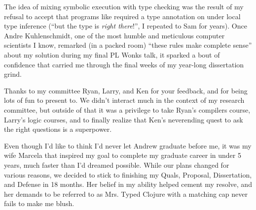The idea of mixing symbolic execution with type checking was the result of my refusal
to accept that programs like  required a type annotation
on  under local type inference
(``but the type is \emph{right there}!'', I repeated to Sam for years).
Once Andre Kuhlenschmidt, one of the most humble and meticulous computer scientists
I know, remarked (in a packed room) ``these rules make complete sense'' 
about my solution during my final PL Wonks talk,
it sparked a bout of confidence that carried
me through the final weeks of my year-long dissertation grind.

Thanks to my committee Ryan, Larry, and Ken for your feedback, and for being
lots of fun to present to.
We didn't interact much in the context of my research committee, but outside of that
it was a privilege to take Ryan's compilers course, Larry's logic courses,
and to finally realize that Ken's neverending quest to ask the right questions
is a superpower.

Even though I'd like to think I'd never let Andrew graduate before me,
it was my wife Marcela that inspired my goal to complete my graduate career in
under 5 years, much faster than I'd dreamed possible.
While our plans changed for various reasons, we decided to stick to
finishing my Quals, Proposal, Dissertation, and Defense in 18 months.
Her belief in my ability helped cement my resolve, and her demands
to be referred to as Mrs. Typed Clojure with a matching cap never
fails to make me blush.
